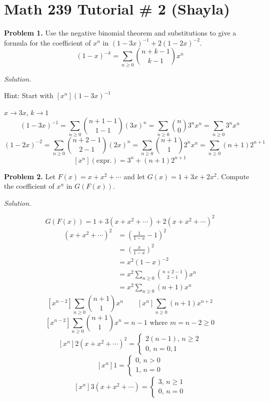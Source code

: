 


\section{Math 239 Tutorial \# 2 (Shayla)}

\textbf{Problem 1.}
Use the negative binomial theorem and substitutions to give a formula for the
coefficient of $ x^n $ in $ (1-3x)^{-1} + 2(1-2x)^{-2} $.
\[ (1-x)^{-k}=\sum\limits_{n\ge 0}\binom{n+k-1}{k-1}x^n \]

\emph{Solution.}

Hint: Start with $ [x^n](1-3x)^{-1} $

$ x\rightarrow 3x $, $ k\rightarrow1 $
\[ (1-3x)^{-1}=\sum\limits_{n\ge 0}\binom{n+1-1}{1-1}(3x)^n
=\sum\limits_{n\ge 0}\binom{n}{0}3^n x^n=\sum\limits_{n\ge 0}3^n x^n  \]
\[ (1-2x)^{-2}=\sum\limits_{n\ge 0}\binom{n+2-1}{2-1}(2x)^n
=\sum\limits_{n\ge 0}\binom{n+1}{1}2^n x^n=\sum\limits_{n\ge 0}(n+1)2^{n+1} \]
\[ [x^n](\text{expr.})=3^n+(n+1)2^{n+1} \]


\textbf{Problem 2.}
Let $ F(x)=x+x^2+\cdots $ and let $ G(x)=1+3x+2x^2 $. Compute the coefficient
of $ x^n $ in $ G(F(x)) $.

\emph{Solution.}

\[ G(F(x))=1+3(x+x^2+\cdots)+2(x+x^2+\cdots)^2 \]
\begin{align*}
    (x+x^2+\cdots)^2&=
    \left( \frac{1}{1-x} -1 \right)^2\\
    &=\left( \frac{x}{1-x}  \right)^2\\
    &=x^2(1-x)^{-2}\\
    &=x^2 \sum\limits_{n\ge 0}\binom{n+2-1}{2-1}x^n\\
    &=x^2 \sum\limits_{n\ge 0}(n+1)x^n 
\end{align*}
\[ [x^{n-2}]\sum\limits_{n\ge 0}\binom{n+1}{1}x^n\qquad
[x^n]\sum\limits_{n\ge 0}(n+1)x^{n+2} \]
\[
    [x^{n-2}]\sum\limits_{n\ge 0}\binom{n+1}{1}x^n=n-1\text{ where }
    m=n-2\ge 0 \]
\[ [x^n]2(x+x^2+\cdots)^2=
\begin{cases}
    2(n-1),\,n\ge 2\\
    0,\,n=0,1
\end{cases} \]
\[ [x^n]1=
\begin{cases}
    0,\,n>0\\
    1,\,n=0
\end{cases} \]
\[ [x^n]3(x+x^2+\cdots)=
\begin{cases}
    3,\,n\ge 1\\
    0,\,n=0
\end{cases} \]

